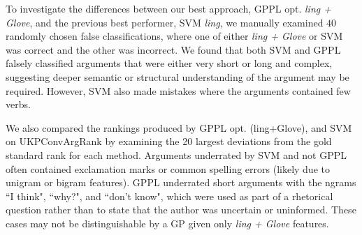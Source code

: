 To investigate the differences between our best approach, GPPL opt. \emph{ling + Glove}, 
and the previous best performer, SVM \emph{ling}, 
we manually examined $40$ randomly chosen false classifications, where one of 
either  \emph{ling + Glove} or SVM was correct and the other was incorrect. 
We found that both SVM and GPPL falsely classified arguments that were either very short or long and complex, suggesting deeper semantic or structural understanding of the argument may be required. However, SVM also made mistakes
where the arguments contained few verbs.

We also compared the rankings produced by GPPL opt. (ling+Glove), 
and SVM on UKPConvArgRank by examining the 20 largest deviations from the 
gold standard rank for each method. Arguments underrated by SVM and not GPPL often 
contained exclamation marks or common spelling errors (likely due to unigram or bigram features).
GPPL underrated short arguments with the ngrams ``I think", ``why?", and
``don't know", which were used as part of a rhetorical question
rather than to state that the author was uncertain or uninformed.
These cases may not be distinguishable by a GP given only \emph{ling + Glove} features.

